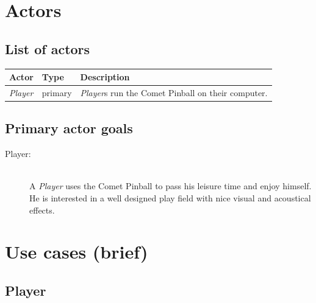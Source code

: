 \documentclass[fontsize=12pt,
               paper=a4,
               twoside=false,
               parskip=half,
               ]{scrartcl}
\begin{document}
\newcommand{\doctitle}{Use Case Model}


\tableofcontents


\section{Actors}

\subsection{List of actors}

\begin{tabular}{llp{9cm}}
\toprule
\textbf{Actor} & \textbf{Type} & \textbf{Description} \\ 
\midrule
\emph{Player} & primary & \emph{Player}s run the Comet Pinball on their computer.

\\ 
\bottomrule 
\end{tabular} 

\subsection{Primary actor goals}

\begin{description}

\item[Player:] \hfill \\
A \emph{Player} uses the Comet Pinball to pass his leisure time and enjoy himself. He is interested in a well designed play field with nice visual and acoustical effects.


\end{description}



\section{Use cases (brief)}

\subsection{Player}
\end{document}
